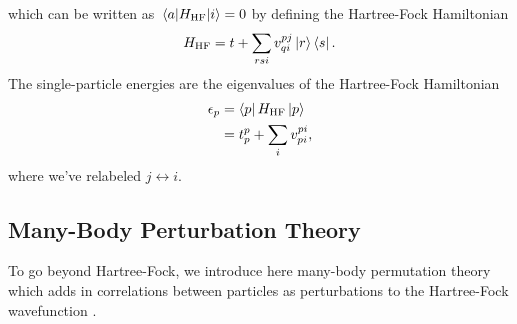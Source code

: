 \documentclass[Dual]{msu-thesis}
\begin{document}
which can be written as $\mel{a}{H_{\text{HF}}}{i}=0$ by defining the Hartree-Fock Hamiltonian
\begin{align}
\label{hf_hamiltonian}
H_{\text{HF}}
=
t
+
\sum_{rsi}v^{pj}_{qi}\ket{r}\bra{s}.
\end{align}
The single-particle energies are the eigenvalues of the Hartree-Fock Hamiltonian
\begin{align}
\label{single_particle_energies}
\epsilon_p
&=
\bra{p}H_{\text{HF}}\ket{p}
\\
&=
t^p_p
+
\sum_{i}
v^{pi}_{pi},
\end{align}
where we've relabeled $j\leftrightarrow i$.

\subsection{Many-Body Perturbation Theory}

To go beyond Hartree-Fock, we introduce here many-body permutation theory which adds in correlations between particles as perturbations to the Hartree-Fock wavefunction \cite{morten_book}.
\end{document}
